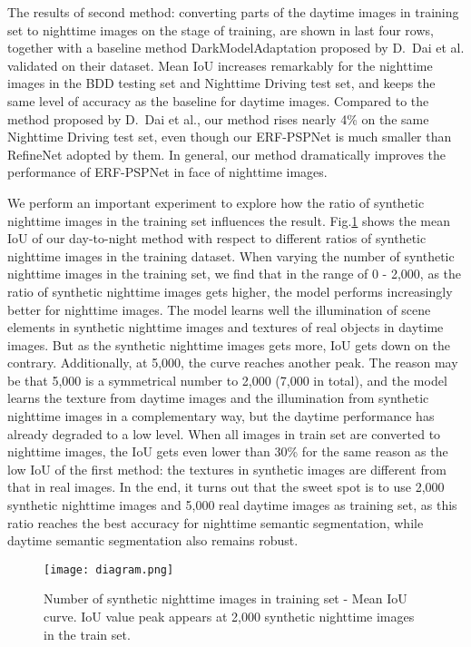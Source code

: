 \documentclass[a4paper]{spie}
\begin{document}
The results of second method: converting parts of the daytime images in training set to nighttime images on the stage of training, are shown in last four rows, together with a baseline method DarkModelAdaptation proposed by D.~Dai et al.\cite{dai2018dark} validated on their dataset. Mean IoU increases remarkably for the nighttime images in the BDD testing set and Nighttime Driving test set, and keeps the same level of accuracy as the baseline for daytime images. Compared to the method proposed by D.~Dai et al.\cite{dai2018dark}, our method rises nearly 4\% on the same Nighttime Driving test set, even though our ERF-PSPNet is much smaller than RefineNet\cite{lin2017refinenet} adopted by them. In general, our method dramatically improves the performance of ERF-PSPNet in face of nighttime images.


We perform an important experiment to explore how the ratio of synthetic nighttime images in the training set influences the result. Fig.\ref{fig:diagram} shows the mean IoU of our day-to-night method with respect to different ratios of synthetic nighttime images in the training dataset. When varying the number of synthetic nighttime images in the training set, we find that in the range of 0 - 2,000, as the ratio of synthetic nighttime images gets higher, the model performs increasingly better for nighttime images. The model learns well the illumination of scene elements in synthetic nighttime images and textures of real objects in daytime images. But as the synthetic nighttime images gets more, IoU gets down on the contrary. Additionally, at 5,000, the curve reaches another peak. The reason may be that 5,000 is a symmetrical number to 2,000 (7,000 in total), and the model learns the texture from daytime images and the illumination from synthetic nighttime images in a complementary way, but the daytime performance has already degraded to a low level. When all images in train set are converted to nighttime images, the IoU gets even lower than 30\% for the same reason as the low IoU of the first method: the textures in synthetic images are different from that in real images. In the end, it turns out that the sweet spot is to use 2,000 synthetic nighttime images and 5,000 real daytime images as training set, as this ratio reaches the best accuracy for nighttime semantic segmentation, while daytime semantic segmentation also remains robust.

\begin{figure}[ht]
   \centering
   \texttt{[image: diagram.png]}
   \caption{\label{fig:diagram}
   Number of synthetic nighttime images in training set - Mean IoU curve. IoU value peak appears at 2,000 synthetic nighttime images in the train set.}
\end{figure}
\end{document}
